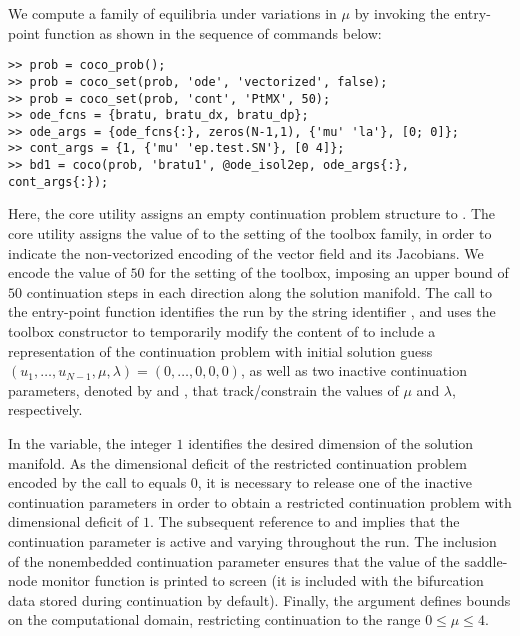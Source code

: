 We compute a family of equilibria under variations in $\mu$ by invoking the  entry-point function as shown in the sequence of commands below:
\begin{lstlisting}[language=coco-highlight]
>> prob = coco_prob();
>> prob = coco_set(prob, 'ode', 'vectorized', false);
>> prob = coco_set(prob, 'cont', 'PtMX', 50);
>> ode_fcns = {bratu, bratu_dx, bratu_dp};
>> ode_args = {ode_fcns{:}, zeros(N-1,1), {'mu' 'la'}, [0; 0]};
>> cont_args = {1, {'mu' 'ep.test.SN'}, [0 4]};
>> bd1 = coco(prob, 'bratu1', @ode_isol2ep, ode_args{:}, cont_args{:});
\end{lstlisting}\label{bratu.bd1}
Here, the  core utility assigns an empty continuation problem structure to . The  core utility assigns the value of  to the  setting of the  toolbox family, in order to indicate the non-vectorized encoding of the vector field and its Jacobians.  We encode the value of $50$ for the  setting of the  toolbox, imposing an upper bound of $50$ continuation steps in each direction along the solution manifold. The call to the  entry-point function identifies the run by the string identifier , and uses the  toolbox constructor to temporarily modify the content of  to include a representation of the continuation problem with initial solution guess $(u_1,\ldots,u_{N-1},\mu,\lambda)=(0,\ldots,0,0,0)$, as well as two inactive continuation parameters, denoted by  and , that track/constrain the values of $\mu$ and $\lambda$, respectively.

In the  variable, the integer $1$ identifies the desired dimension of the solution manifold. As the dimensional deficit of the restricted continuation problem encoded by the call to  equals $0$, it is necessary to release one of the inactive continuation parameters in order to obtain a restricted continuation problem with dimensional deficit of $1$. The subsequent reference to  and  implies that the continuation parameter  is active and varying throughout the run. The inclusion of the  nonembedded continuation parameter ensures that the value of the saddle-node monitor function is printed to screen (it is included with the bifurcation data stored during continuation by default). Finally, the argument \mcode{[0 4]} defines bounds on the computational domain, restricting continuation to the range \mbox{$0\le\mu\le 4$}.

